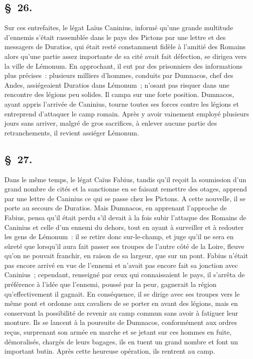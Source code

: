 \documentclass[french,twoside]{book} %
\begin{document}
\subsection[{§ 26.}]{ \textsc{§ 26.} }
\noindent Sur ces entrefaites, le légat Laïus Caninius, informé qu’une grande multitude d’ennemis s’était rassemblée dans le pays des Pictons par une lettre et des messagers de Duratios, qui était resté constamment fidèle à l’amitié des Romains alors qu’une partie assez importante de sa cité avait fait défection, se dirigea vers la ville de Lémonum. En approchant, il eut par des prisonniers des informations plus précises : plusieurs milliers d’hommes, conduits par Dumnacos, chef des Andes, assiégeaient Duratios dans Lémonum ; n’osant pas risquer dans une rencontre des légions peu solides. Il campa sur une forte position. Dumnacos, ayant appris l’arrivée de Caninius, tourne toutes ses forces contre les légions et entreprend d’attaquer le camp romain. Après y avoir vainement employé plusieurs jours sans arriver, malgré de gros sacrifices, à enlever aucune partie des retranchements, il revient assiéger Lémonum.
\subsection[{§ 27.}]{ \textsc{§ 27.} }
\noindent Dans le même temps, le légat Caïus Fabius, tandis qu’il reçoit la soumission d’un grand nombre de cités et la sanctionne en se faisant remettre des otages, apprend par une lettre de Caninius ce qui se passe chez les Pictons. A cette nouvelle, il se porte au secours de Duratios. Mais Dumnacos, en apprenant l’approche de Fabius, pensa qu’il était perdu s’il devait à la fois subir l’attaque des Romains de Caninius et celle d’un ennemi du dehors, tout en ayant à surveiller et à redouter les gens de Lémonum : il se retire donc sur-le-champ, et juge qu’il ne sera en sûreté que lorsqu’il aura fait passer ses troupes de l’autre côté de la Loire, fleuve qu’on ne pouvait franchir, en raison de sa largeur, que sur un pont. Fabius n’était pas encore arrivé en vue de l’ennemi et n’avait pas encore fait sa jonction avec Caninius ; cependant, renseigné par ceux qui connaissaient le pays, il s’arrêta de préférence à l’idée que l’ennemi, poussé par la peur, gagnerait la région qu’effectivement il gagnait. En conséquence, il se dirige avec ses troupes vers le même pont et ordonne aux cavaliers de se porter en avant des légions, mais en conservant la possibilité de revenir au camp commun sans avoir à fatiguer leur monture. Ils se lancent à la poursuite de Dumnacos, conformément aux ordres reçus, surprenant son armée en marche et se jetant sur ces hommes en fuite, démoralisés, chargés de leurs bagages, ils en tuent un grand nombre et font un important butin. Après cette heureuse opération, ils rentrent au camp.
\end{document}
